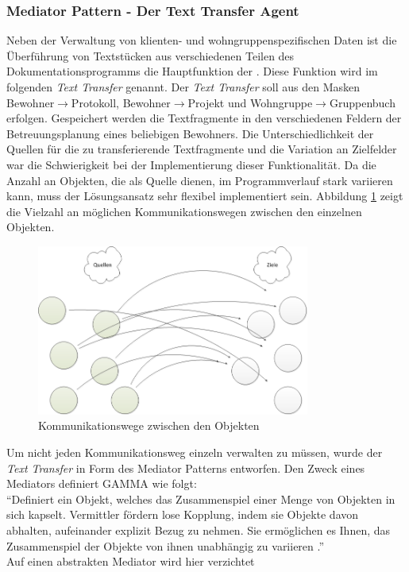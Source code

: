 \subsubsection{Mediator Pattern - Der Text Transfer Agent}
Neben der Verwaltung von klienten- und wohngruppenspezifischen Daten ist die Überführung von Textstücken aus verschiedenen Teilen des
Dokumentationsprogramms die Hauptfunktion der \EBP. Diese Funktion wird im folgenden \textit{Text Transfer} genannt. \newline
Der \textit{Text Transfer} soll aus den Masken Bewohner$\rightarrow$Protokoll, Bewohner$\rightarrow$Projekt und Wohngruppe$\rightarrow$Gruppenbuch
erfolgen. Gespeichert werden die Textfragmente in den verschiedenen Feldern der Betreuungsplanung eines beliebigen Bewohners. Die Unterschiedlichkeit
der Quellen für die zu transferierende Textfragmente und die Variation an Zielfelder war die Schwierigkeit bei der Implementierung dieser
Funktionalität. Da die Anzahl an Objekten, die als Quelle dienen, im Programmverlauf stark variieren kann, muss der Lösungsansatz sehr flexibel
implementiert sein. Abbildung \ref{unstrukturiert} zeigt die Vielzahl an möglichen Kommunikationswegen zwischen den einzelnen Objekten.\\
\begin{figure}[htp!]
	\includegraphics[width=0.8\textwidth]{unmediated}
	\caption{Kommunikationswege zwischen den Objekten}
	\label{unstrukturiert}
\end{figure}
Um nicht jeden Kommunikationsweg einzeln verwalten zu müssen, wurde der \textit{Text Transfer} in Form des Mediator Patterns entworfen. Den Zweck
eines Mediators definiert GAMMA wie folgt: \\
``Definiert ein Objekt, welches das Zusammenspiel einer Menge von Objekten in sich kapselt. Vermittler fördern lose Kopplung, indem sie Objekte davon
abhalten, aufeinander explizit Bezug zu nehmen. Sie ermöglichen es Ihnen, das Zusammenspiel der Objekte von ihnen unabhängig zu
variieren \cite[S. 385]{Entwurfsmuster}.''\\
Auf einen abstrakten Mediator wird hier verzichtet 

